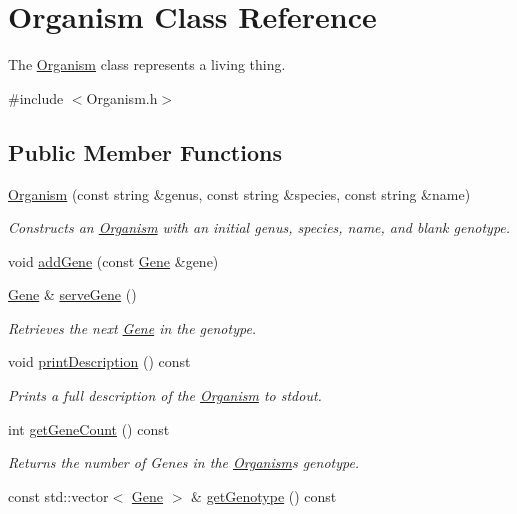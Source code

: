 \hypertarget{class_organism}{}\section{Organism Class Reference}
\label{class_organism}


The \hyperlink{class_organism}{Organism} class represents a living thing.  




{\ttfamily \#include $<$Organism.\+h$>$}

\subsection*{Public Member Functions}
\begin{DoxyCompactItemize}
\item 
\hyperlink{class_organism_a4e5d98843608364964a6616e630f9c3b}{Organism} (const string \&genus, const string \&species, const string \&name)
\begin{DoxyCompactList}\small\item\em Constructs an \hyperlink{class_organism}{Organism} with an initial genus, species, name, and blank genotype. \end{DoxyCompactList}\item 
void \hyperlink{class_organism_a3dd60a8f90366cd02ba10e32bc2aae3c}{add\+Gene} (const \hyperlink{class_gene}{Gene} \&gene)
\item 
\hyperlink{class_gene}{Gene} \& \hyperlink{class_organism_a8b587d97ced82e377dc7bc9e5c5613fe}{serve\+Gene} ()
\begin{DoxyCompactList}\small\item\em Retrieves the next \hyperlink{class_gene}{Gene} in the genotype. \end{DoxyCompactList}\item 
void \hyperlink{class_organism_ab380985fd979d880e08dd5b11e97e2cb}{print\+Description} () const 
\begin{DoxyCompactList}\small\item\em Prints a full description of the \hyperlink{class_organism}{Organism} to stdout. \end{DoxyCompactList}\item 
\hypertarget{class_organism_a9719a5a125a051c2fadffe6f4d9a8bb8}{}int \hyperlink{class_organism_a9719a5a125a051c2fadffe6f4d9a8bb8}{get\+Gene\+Count} () const \label{class_organism_a9719a5a125a051c2fadffe6f4d9a8bb8}

\begin{DoxyCompactList}\small\item\em Returns the number of Genes in the \hyperlink{class_organism}{Organism}\textquotesingle{}s genotype. \end{DoxyCompactList}\item 
\hypertarget{class_organism_a1744d697440baff0a30a9eded7322f2a}{}const std\+::vector$<$ \hyperlink{class_gene}{Gene} $>$ \& \hyperlink{class_organism_a1744d697440baff0a30a9eded7322f2a}{get\+Genotype} () const \label{class_organism_a1744d697440baff0a30a9eded7322f2a}


\end{DoxyCompactItemize}
